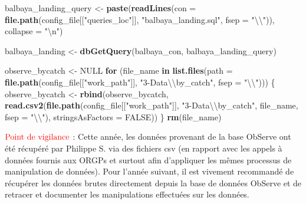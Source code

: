 \documentclass[]{article}
\newenvironment{Shaded}{\begin{snugshade}}{\end{snugshade}}
\newcommand{\CharTok}[1]{\textcolor[rgb]{0.31,0.60,0.02}{#1}}
\newcommand{\ControlFlowTok}[1]{\textcolor[rgb]{0.13,0.29,0.53}{\textbf{#1}}}
\newcommand{\DataTypeTok}[1]{\textcolor[rgb]{0.13,0.29,0.53}{#1}}
\newcommand{\KeywordTok}[1]{\textcolor[rgb]{0.13,0.29,0.53}{\textbf{#1}}}
\newcommand{\NormalTok}[1]{#1}
\newcommand{\OtherTok}[1]{\textcolor[rgb]{0.56,0.35,0.01}{#1}}
\newcommand{\StringTok}[1]{\textcolor[rgb]{0.31,0.60,0.02}{#1}}
\begin{document}
\begin{Shaded}
\begin{Highlighting}[]
\NormalTok{balbaya_landing_query <-}\StringTok{ }\KeywordTok{paste}\NormalTok{(}\KeywordTok{readLines}\NormalTok{(}\DataTypeTok{con =} \KeywordTok{file.path}\NormalTok{(config_file[[}\StringTok{"queries_loc"}\NormalTok{]], }
    \StringTok{"balbaya_landing.sql"}\NormalTok{, }\DataTypeTok{fsep =} \StringTok{"}\CharTok{\textbackslash{}\textbackslash{}}\StringTok{"}\NormalTok{)), }
    \DataTypeTok{collapse =} \StringTok{"}\CharTok{\textbackslash{}n}\StringTok{"}\NormalTok{)}

\NormalTok{balbaya_landing <-}\StringTok{ }\KeywordTok{dbGetQuery}\NormalTok{(balbaya_con, }
\NormalTok{    balbaya_landing_query)}

\NormalTok{observe_bycatch <-}\StringTok{ }\OtherTok{NULL}
\ControlFlowTok{for}\NormalTok{ (file_name }\ControlFlowTok{in} \KeywordTok{list.files}\NormalTok{(}\DataTypeTok{path =} \KeywordTok{file.path}\NormalTok{(config_file[[}\StringTok{"work_path"}\NormalTok{]], }
    \StringTok{"3-Data}\CharTok{\textbackslash{}\textbackslash{}}\StringTok{by_catch"}\NormalTok{, }\DataTypeTok{fsep =} \StringTok{"}\CharTok{\textbackslash{}\textbackslash{}}\StringTok{"}\NormalTok{))) \{}
\NormalTok{    observe_bycatch <-}\StringTok{ }\KeywordTok{rbind}\NormalTok{(observe_bycatch, }
        \KeywordTok{read.csv2}\NormalTok{(}\KeywordTok{file.path}\NormalTok{(config_file[[}\StringTok{"work_path"}\NormalTok{]], }
            \StringTok{"3-Data}\CharTok{\textbackslash{}\textbackslash{}}\StringTok{by_catch"}\NormalTok{, file_name, }
            \DataTypeTok{fsep =} \StringTok{"}\CharTok{\textbackslash{}\textbackslash{}}\StringTok{"}\NormalTok{), }\DataTypeTok{stringsAsFactors =} \OtherTok{FALSE}\NormalTok{))}
\NormalTok{\}}
\KeywordTok{rm}\NormalTok{(file_name)}
\end{Highlighting}
\end{Shaded}

\textbf{\(\color{red}{\text{Point de vigilance}}\)} : Cette année, les
données provenant de la base ObServe ont été récupéré par Philippe S.
via des fichiers csv (en rapport avec les appels à données fournis aux
ORGPs et surtout afin d'appliquer les mêmes processus de manipulation de
données). Pour l'année suivant, il est vivement recommandé de récupérer
les données brutes directement depuis la base de données ObServe et de
retracer et documenter les manipulations effectuées sur les données.
\end{document}
